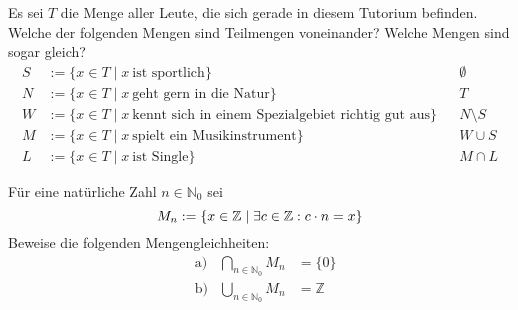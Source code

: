 




\begin{aufg}[Kennenlernen]
Es sei $T$ die Menge aller Leute, die sich gerade in diesem Tutorium befinden. Welche der folgenden Mengen sind Teilmengen voneinander? Welche Mengen sind sogar gleich?
\begin{align*}
S&:= \{ x\in T \mid x\ \text{ist sportlich} \}  && \emptyset  \\
N&:=  \{ x\in T \mid x\ \text{geht gern in die Natur} \} && T \\
W & := \{ x\in T \mid x\ \text{kennt sich in einem Spezialgebiet richtig gut aus} \} &&  N\setminus S  \\
M &:= \{ x \in T \mid x\ \text{spielt ein Musikinstrument} \} && W \cup S \\
L&:= \{ x\in T \mid x\ \text{ist Single} \} && M\cap L
\end{align*}
\end{aufg}

\begin{comment}
\begin{align*}
 \{x\in \Rz \mid x^3 - 4x = 0 \} &&  \emptyset \\
 \{ n \in \Zz \mid n\ \text{ist eine gerade Zahl} \} &&  \{2\} \\
 \{ x\in \Rz \mid \exists n\in \Zz : n\cdot x \in \Zz \} &&  \{ n\in \Zz \mid \vert n\vert < 4\} \\
 \Nz \setminus \{n\in \Nz \mid n\ \text{ist durch $3$ teilbar} \} &&  \bigcup_{n\in \Nz_{\geq 1}} \left\{ \frac{z}{n} \mid z\in \Zz \right\}
\end{align*}
\end{comment}






\begin{aufg}
Für eine natürliche Zahl $n\in\mathbb{N}_0$ sei
\[ M_n:=\{x\in\mathbb{Z}\mid \exists c\in {\mathbb Z}: c\cdot n = x\} \]
Beweise die folgenden Mengengleichheiten:
\begin{align*}
 & \text{a)} & \bigcap_{n\in\mathbb{N}_0} M_n &= \{0\} \\
 & \text{b)} & \bigcup_{n\in\mathbb{N}_0} M_n & = \mathbb{Z}
 \end{align*}
\end{aufg}






